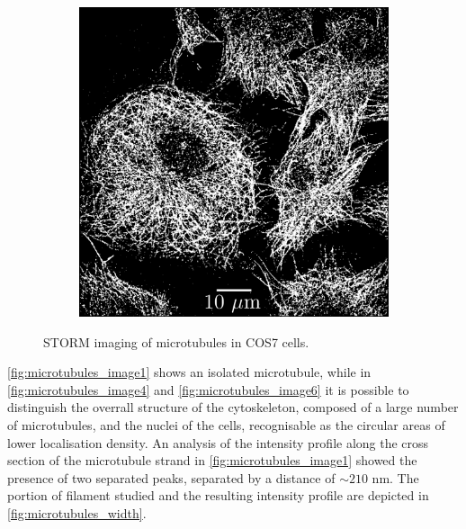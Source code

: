 \begin{figure}
\begin{subfigure}{0.32\textwidth}
        \caption{}
        \label{fig:microtubules_image4}
    \end{subfigure}
    \begin{subfigure}{0.32\textwidth}
        \includegraphics[width=\textwidth]{figures/microtubules_image6.png}
        \caption{}
        \label{fig:microtubules_image6}
    \end{subfigure}
    \caption{STORM imaging of microtubules in COS7 cells.}
    \label{fig:microtubules_images}
\end{figure}
%
\autoref{fig:microtubules_image1} shows an isolated microtubule, while in \autoref{fig:microtubules_image4} and \autoref{fig:microtubules_image6} it is possible to distinguish the overrall structure of the cytoskeleton, composed of a large number of microtubules, and the nuclei of the cells, recognisable as the circular areas of lower localisation density.
An analysis of the intensity profile along the cross section of the microtubule strand in \autoref{fig:microtubules_image1} showed the presence of two separated peaks, separated by a distance of $\sim 210$ nm.
The portion of filament studied and the resulting intensity profile are depicted in \autoref{fig:microtubules_width}.
%

